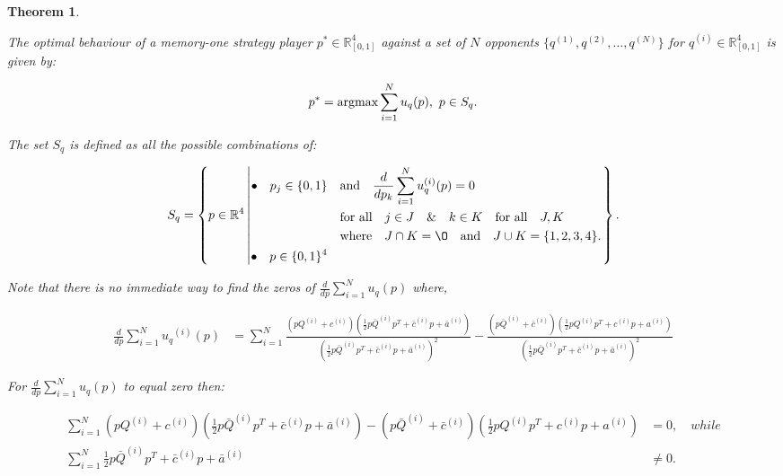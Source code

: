 \documentclass[10pt]{article}
\newcommand{\R}{\mathbb{R}}
\newtheorem{theorem}{Theorem}
\begin{document}
\begin{theorem}\label{memone_group_best_response}

    The optimal behaviour of a memory-one strategy player \(p^* \in \R_{[0, 1]} ^
    4\) against a set of \(N\) opponents \(\{q^{(1)}, q^{(2)}, \dots, q^{(N)} \}\)
    for \(q^{(i)} \in \R_{[0, 1]} ^ 4\) is given by:

    \[p^* = \textnormal{argmax}\sum\limits_{i=1} ^ N  u_q(p), \ p \in S_q.\]

    The set \(S_q\) is defined as all the possible combinations of:

    {\scriptsize
    \begin{equation}\label{eq:s_q_set}
        S_q =
        \left\{p \in \mathbb{R} ^ 4 \left|
            \begin{aligned}
                \bullet\quad p_j \in \{0, 1\} & \quad \text{and} \quad \frac{d}{dp_k}
                \sum\limits_{i=1} ^ N  u_q^{(i)}(p) = 0 \\
                & \quad \text{for all} \quad j \in J \quad \&  \quad k \in K  \quad \text{for all} \quad J, K \\
                & \quad \text{where} \quad J \cap K = \O \quad
                \text{and} \quad J \cup K = \{1, 2, 3, 4\}.\\
                \bullet\quad  p \in \{0, 1\} ^ 4
            \end{aligned}\right.
        \right\}.
    \end{equation}
    }

    Note that there is no immediate way to find the zeros of \(\frac{d}{dp}
    \sum\limits_{i=1} ^ N  u_q(p)\) where,

    {\scriptsize
    \begin{align}\label{eq:mo_tournament_derivative}
        \frac{d}{dp} \sum\limits_{i=1} ^ {N} {u_q}^{(i)} (p) & = \displaystyle\sum\limits_{i=1} ^ {N}
        \frac{\left(pQ^{(i)} + c^{(i)}\right) \left(\frac{1}{2} p\bar{Q}^{(i)} p^T + \bar{c}^{(i)} p + \bar{a}^ {(i)}\right)}
        {\left(\frac{1}{2} p\bar{Q}^{(i)} p^T + \bar{c}^{(i)} p + \bar{a}^ {(i)}\right)^ 2}
        - \frac{\left(p\bar{Q}^{(i)} + \bar{c}^{(i)}\right) \left(\frac{1}{2} pQ^{(i)} p^T + c^{(i)} p + a^ {(i)}\right)}
        {\left(\frac{1}{2} p\bar{Q}^{(i)} p^T + \bar{c}^{(i)} p + \bar{a}^ {(i)}\right)^ 2}
    \end{align}
    }

    For \(\frac{d}{dp} \sum\limits_{i=1} ^ N  u_q(p)\) to equal zero then:

    {\scriptsize
    \begin{align}\label{eq:polynomials_roots}
        \displaystyle\sum\limits_{i=1} ^ {N}
        \left(pQ^{(i)} + c^{(i)}\right) \left(\frac{1}{2} p\bar{Q}^{(i)} p^T + \bar{c}^{(i)} p + \bar{a}^ {(i)}\right)
        - \left(p\bar{Q}^{(i)} + \bar{c}^{(i)}\right) \left(\frac{1}{2} pQ^{(i)} p^T + c^{(i)} p + a^ {(i)}\right)
        & = 0, \quad {while} \\
        \displaystyle\sum\limits_{i=1} ^ {N} \frac{1}{2} p\bar{Q}^{(i)} p^T + \bar{c}^{(i)} p + \bar{a}^ {(i)} & \neq 0.
    \end{align}}

\end{theorem}
\end{document}
